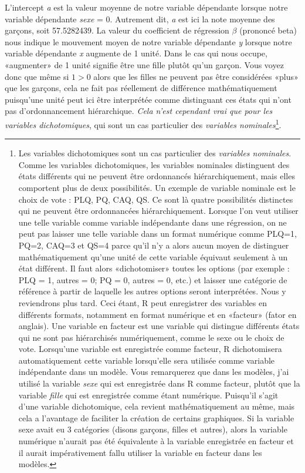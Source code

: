 \documentclass[
]{book}
\begin{document}
L'intercept \emph{a} est la valeur moyenne de notre variable dépendante lorsque notre variable dépendante \emph{sexe} = 0. Autrement dit, \emph{a} est ici la note moyenne des garçons, soit 57.5282439. La valeur du coefficient de régression \(\beta\) (prononcé beta) nous indique le mouvement moyen de notre variable dépendante \emph{y} lorsque notre variable dépendante \emph{x} augmente de 1 unité. Dans le cas qui nous occupe, «augmenter» de 1 unité signifie être une fille plutôt qu'un garçon. Vous voyez donc que même si \(1>0\) alors que les filles ne peuvent pas être considérées «plus» que les garçons, cela ne fait pas réellement de différence mathématiquement puisqu'une unité peut ici être interprétée comme distinguant ces états qui n'ont pas d'ordonnancement hiérarchique. \emph{Cela n'est cependant vrai que pour les variables dichotomiques}, qui sont un cas particulier des \emph{variables nominales}\footnote{Les variables dichotomiques sont un cas particulier des \emph{variables nominales}. Comme les variables dichotomiques, les variables nominales distinguent des états différents qui ne peuvent être ordonnancés hiérarchiquement, mais elles comportent plus de deux possibilités. Un exemple de variable nominale est le choix de vote : PLQ, PQ, CAQ, QS. Ce sont là quatre possibilités distinctes qui ne peuvent être ordonnancées hiérarchiquement. Lorsque l'on veut utiliser une telle variable comme variable indépendante dans une régression, on ne peut pas laisser une telle variable dans un format numérique comme PLQ=1, PQ=2, CAQ=3 et QS=4 parce qu'il n'y a alors aucun moyen de distinguer mathématiquement qu'une unité de cette variable équivaut seulement à un état différent. Il faut alors «dichotomiser» toutes les options (par exemple : PLQ = 1, autres = 0; PQ = 0, autres = 0, etc.) et laisser une catégorie de référence à partir de laquelle les autres options seront interprétées. Nous y reviendrons plus tard. Ceci étant, R peut enregistrer des variables en différents formats, notamment en format numérique et en «facteur» (fator en anglais). Une variable en facteur est une variable qui distingue différents états qui ne sont pas hiérarchisés numériquement, comme le sexe ou le choix de vote. Lorsqu'une variable est enregistrée comme facteur, R dichotomisera automatiquement cette variable lorsqu'elle sera utilisée comme variable indépendante dans un modèle. Vous remarquerez que dans les modèles, j'ai utilisé la variable \emph{sexe} qui est enregistrée dans R comme facteur, plutôt que la variable \emph{fille} qui est enregistrée comme étant numérique. Puisqu'il s'agit d'une variable dichotomique, cela revient mathématiquement au même, mais cela a l'avantage de faciliter la création de certains graphiques. Si la variable sexe avait eu 3 catégories (disons garçons, filles et autres), alors la variable numérique n'aurait pas été équivalente à la variable enregistrée en facteur et il aurait impérativement fallu utiliser la variable en facteur dans les modèles.}.
\end{document}
